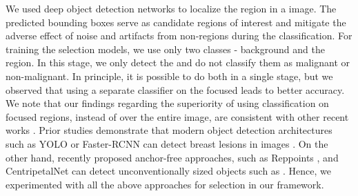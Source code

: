 %
We used deep object detection networks to localize the \gb region in a \usg image. The predicted bounding boxes serve as candidate regions of interest and mitigate the adverse effect of noise and artifacts from non-\gb regions during the classification. For training the \roi selection models, we use only two classes - background and the \gb region. In this stage, we only detect the \gb and do not classify them as malignant or non-malignant. In principle, it is possible to do both in a single stage, but we observed 
that using a separate classifier on the focused \rois leads to better accuracy. We note that our findings regarding the superiority of using classification on focused regions, instead of over the entire image, are consistent with other recent works \cite{lancet_pancreas, cao2019BreastLesion, fan2020inf, sirinukunwattana2016locality, eccv2020_devil_in_classification}. Prior studies demonstrate that modern object detection architectures such as YOLO \cite{yolov4} or Faster-RCNN \cite{fasterrcnn} can detect breast lesions in \usg images  \cite{cao2019BreastLesion}. On the other hand, recently proposed anchor-free approaches, such as Reppoints \cite{reppoints}, and CentripetalNet \cite{centripetalnet} can detect unconventionally sized objects such as \gb. Hence, we experimented with all the above approaches for \roi selection in our framework. 

